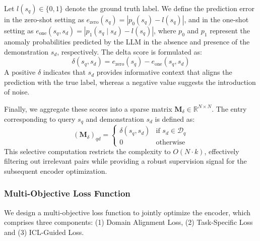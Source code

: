 \documentclass[lettersize,journal]{IEEEtran}
\begin{document}
Let $l(s_q) \in \{0,1\}$ denote the ground truth label. We define the prediction error in the zero-shot setting as $e_{\text{zero}}(s_q) = |p_0(s_q) - l(s_q)|$, and in the one-shot setting as $e_{\text{one}}(s_q, s_d) = |p_1(s_q \mid s_d) - l(s_q)|$, where $p_0$ and $p_1$ represent the anomaly probabilities predicted by the LLM in the absence and presence of the demonstration $s_d$, respectively. The delta score is formulated as:
\begin{equation}
\label{eq:delta}
\delta(s_q, s_d) = e_{\text{zero}}(s_q) - e_{\text{one}}(s_q, s_d)
\end{equation}
A positive $\delta$ indicates that $s_d$ provides informative context that aligns the prediction with the true label, whereas a negative value suggests the introduction of noise.

Finally, we aggregate these scores into a sparse matrix $\mathbf{M}_\delta \in \mathbb{R}^{N \times N}$. The entry corresponding to query $s_q$ and demonstration $s_d$ is defined as:
\begin{equation}
(\mathbf{M}_\delta)_{qd} = 
\begin{cases} 
\delta(s_q, s_d) & \text{if } s_d \in \mathcal{D}_q \\
0 & \text{otherwise}
\end{cases}
\end{equation}
This selective computation restricts the complexity to $O(N \cdot k)$, effectively filtering out irrelevant pairs while providing a robust supervision signal for the subsequent encoder optimization.

\subsubsection{Multi-Objective Loss Function}


We design a multi-objective loss function to jointly optimize the encoder, which comprises three components: (1) Domain Alignment Loss, (2) Task-Specific Loss and (3) ICL-Guided Loss. 
\end{document}
